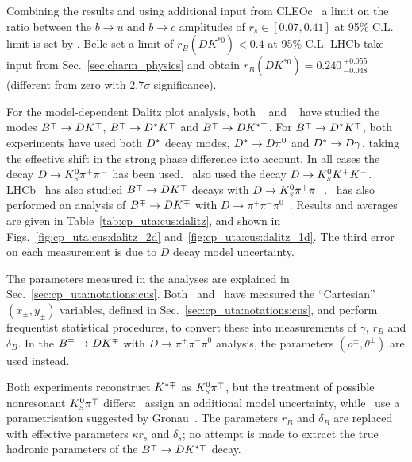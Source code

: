 

Combining the results and using additional input from
CLEOc~\cite{Asner:2008ft,Lowery:2009id} a limit on the ratio between the 
$b \to u$ and $b \to c$ amplitudes of $r_s \in \left[ 0.07,0.41 \right]$ 
at 95\% C.L. limit is set by \babar.
Belle set a limit of $r_B(DK^{*0}) < 0.4$ at 95\% C.L. 
LHCb take input from Sec.~\ref{sec:charm_physics} and obtain $r_B(DK^{*0}) = 0.240 \,^{+0.055}_{-0.048}$ (different from zero with $2.7\sigma$ significance). 

\label{sec:cp_uta:cus:dalitz}

For the model-dependent Dalitz plot analysis, both 
\babar~\cite{Aubert:2008bd} and
\belle~\cite{Poluektov:2010wz,Poluektov:2006ia} have studied the modes 
$B^\mp \to DK^\mp$, $B^\mp \to D^*K^\mp$ and $B^\mp \to DK^{*\mp}$.
For $B^\mp \to D^*K^\mp$,
both experiments have used both $D^*$ decay modes, $D^* \to D\pi^0$ and
$D^* \to D\gamma$, taking the effective shift in the strong phase
difference into account. 
In all cases the decay $D \to K^0_{\scriptscriptstyle S}\pi^+\pi^-$ has been used.
\babar\ also used the decay $D \to K^0_{\scriptscriptstyle S} K^+K^-$.
LHCb~\cite{Aaij:2014iba} has also studied $B^\mp \to DK^\mp$ decays with $D \to K^0_{\scriptscriptstyle S}\pi^+\pi^-$.
\babar\ has also performed an analysis of $B^\mp \to DK^\mp$ with 
$D \to \pi^+\pi^-\pi^0$~\cite{Aubert:2007ii}.
Results and averages are given in Table~\ref{tab:cp_uta:cus:dalitz}, and shown in Figs.~\ref{fig:cp_uta:cus:dalitz_2d} and~\ref{fig:cp_uta:cus:dalitz_1d}.
The third error on each measurement is due to $D$ decay model uncertainty.

The parameters measured in the analyses are explained in
Sec.~\ref{sec:cp_uta:notations:cus}.
Both \babar\ and \belle\ have measured the ``Cartesian''
$(x_\pm,y_\pm)$ variables, defined in Sec.~\ref{sec:cp_uta:notations:cus}, 
and perform frequentist statistical procedures,
to convert these into measurements of $\gamma$, $r_B$ and $\delta_B$.
In the $B^\mp \to DK^\mp$ with $D \to \pi^+\pi^-\pi^0$ analysis,
the parameters $(\rho^{\pm}, \theta^\pm)$ are used instead.

Both experiments reconstruct $K^{*\mp}$ as $K^0_{\scriptscriptstyle S}\pi^\mp$,
but the treatment of possible nonresonant $K^0_{\scriptscriptstyle S}\pi^\mp$ differs:
\belle\ assign an additional model uncertainty,
while \babar\ use a parametrisation suggested by Gronau~\cite{Gronau:2002mu}.
The parameters $r_B$ and $\delta_B$ are replaced with 
effective parameters $\kappa r_s$ and $\delta_s$;
no attempt is made to extract the true hadronic parameters 
of the $B^\mp \to DK^{*\mp}$ decay.

